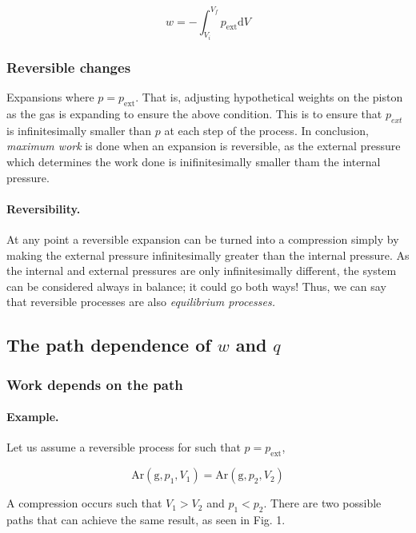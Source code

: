 \documentclass{article}
\numberwithin{theorem}{section}
\numberwithin{corollary}{section}
\numberwithin{postulate}{section}
\numberwithin{lemma}{section}
\numberwithin{definition}{section}
\begin{document}
\begin{equation}
  w = - \int_{V_i}^{V_f} p_\mathrm{ext} \mathrm{d}V
\end{equation}

\subsubsection{Reversible changes}

Expansions where $p = p_\mathrm{ext}$. That is, adjusting hypothetical weights on the
piston as the gas is expanding to ensure the above condition. This is to ensure
that $p_{ext}$ is infinitesimally smaller than $p$ at each step of the process.
In conclusion, \textit{maximum work} is done when an expansion is reversible, as the external
pressure which determines the work done is inifinitesimally smaller tham the
internal pressure.

\paragraph{Reversibility. }At any point a reversible expansion can be turned into
a compression simply by making the external pressure infinitesimally greater
than the internal pressure. As the internal and external pressures are only
infinitesimally different, the system can be considered always in balance; it
could go both ways! Thus, we can say that reversible processes are also
\textit{equilibrium processes.}

\subsection{The path dependence of $w$ and $q$}

\subsubsection{Work depends on the path}

\paragraph{Example. }Let us assume a reversible process for such that $p =
p_\mathrm{ext}$,

\begin{equation*}
  \mathrm{Ar} (\mathrm{g}, p_1, V_1) = \mathrm{Ar} (\mathrm{g}, p_2, V_2)
\end{equation*}

A compression occurs such that $V_1 > V_2$ and $p_1 < p_2$. There are two
possible paths that can achieve the same result, as seen in Fig. 1.
\end{document}
